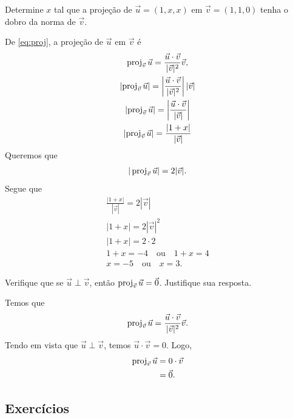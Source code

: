 \begin{exeresol}
  Determine $x$ tal que a projeção de $\vec{u}=(1,x,x)$ em $\vec{v}=(1,1,0)$ tenha o dobro da norma de $\vec{v}$.
\end{exeresol}
\begin{resol}
  De \eqref{eq:proj}, a projeção de $\vec{u}$ em $\vec{v}$ é
  \begin{gather}
    \operatorname{proj}_{\vec{v}}\vec{u} = \frac{\vec{u}\cdot\vec{v}}{|\vec{v}|^2}\vec{v},\\
    \left|\operatorname{proj}_{\vec{v}}\vec{u}\right| = \left|\frac{\vec{u}\cdot\vec{v}}{|\vec{v}|^2}\right||\vec{v}| \\
    \left|\operatorname{proj}_{\vec{v}}\vec{u}\right| = \left|\frac{\vec{u}\cdot\vec{v}}{|\vec{v}|}\right| \\
      \left|\operatorname{proj}_{\vec{v}}\vec{u}\right| = \frac{|1+x|}{|\vec{v}|}
  \end{gather}
  Queremos que
  \begin{gather}
    |\operatorname{proj}_{\vec{v}}\vec{u}| = 2|\vec{v}|.
  \end{gather}
  Segue que
  \begin{gather}
    \frac{|1+x|}{|\vec{v}|} = 2|\vec{v}|\\
      |1+x| = 2|\vec{v}|^2 \\
      |1+x| = 2\cdot 2 \\
      1+x = -4\quad\text{ou}\quad 1+x=4\\
      x=-5\quad\text{ou}\quad x=3.
  \end{gather}
\end{resol}

\begin{exeresol}
  Verifique que se $\vec{u}\perp\vec{v}$, então $\operatorname{proj}_{\vec{v}}\vec{u}=\vec{0}$. Justifique sua resposta.
\end{exeresol}
\begin{resol}
  Temos que
  \begin{equation}
    \operatorname{proj}_{\vec{v}}\vec{u} = \frac{\vec{u}\cdot\vec{v}}{|\vec{v}|^2}\vec{v}.
  \end{equation}
  Tendo em vista que $\vec{u}\perp\vec{v}$, temos $\vec{u}\cdot\vec{v}=0$. Logo,
  \begin{align}
    \operatorname{proj}_{\vec{v}}\vec{u} &= 0\cdot\vec{v}\\
                           &= \vec{0}.
  \end{align}
\end{resol}

\subsection{Exercícios}

